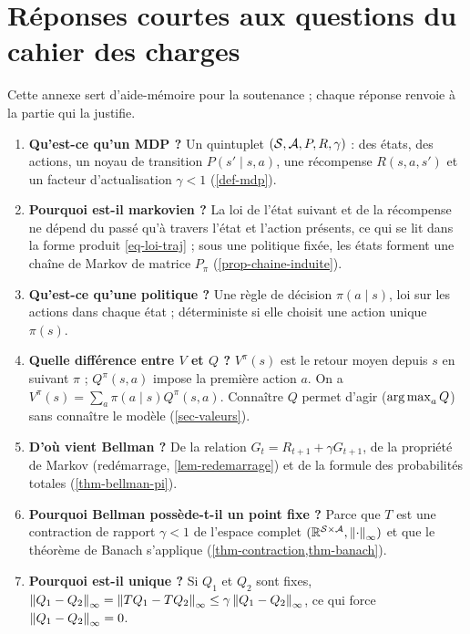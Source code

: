 \appendix

\section{Réponses courtes aux questions du cahier des charges}\label{sec-reponses}

Cette annexe sert d'aide-mémoire pour la soutenance ; chaque réponse renvoie à la partie qui la justifie.

\begin{enumerate}[leftmargin=*]
\item \textbf{Qu'est-ce qu'un MDP ?} Un quintuplet $(\mathcal{S},\mathcal{A},P,R,\gamma)$ : des états, des actions, un noyau de transition $P(s'\mid s,a)$, une récompense $R(s,a,s')$ et un facteur d'actualisation $\gamma<1$ (\cref{def-mdp}).
\item \textbf{Pourquoi est-il markovien ?} La loi de l'état suivant et de la récompense ne dépend du passé qu'à travers l'état et l'action présents, ce qui se lit dans la forme produit \eqref{eq-loi-traj} ; sous une politique fixée, les états forment une chaîne de Markov de matrice $P_\pi$ (\cref{prop-chaine-induite}).
\item \textbf{Qu'est-ce qu'une politique ?} Une règle de décision $\pi(a\mid s)$, loi sur les actions dans chaque état ; déterministe si elle choisit une action unique $\pi(s)$.
\item \textbf{Quelle différence entre $V$ et $Q$ ?} $V^\pi(s)$ est le retour moyen depuis $s$ en suivant $\pi$ ; $Q^\pi(s,a)$ impose la première action $a$. On a $V^\pi(s)=\sum_a\pi(a\mid s)Q^\pi(s,a)$. Connaître $Q$ permet d'agir ($\operatorname*{arg\,max}_aQ$) sans connaître le modèle (\cref{sec-valeurs}).
\item \textbf{D'où vient Bellman ?} De la relation $G_t=R_{t+1}+\gamma G_{t+1}$, de la propriété de Markov (redémarrage, \cref{lem-redemarrage}) et de la formule des probabilités totales (\cref{thm-bellman-pi}).
\item \textbf{Pourquoi Bellman possède-t-il un point fixe ?} Parce que $T$ est une contraction de rapport $\gamma<1$ de l'espace complet $(\mathbb{R}^{\mathcal{S}\times\mathcal{A}},\left\lVert \cdot \right\rVert_\infty)$ et que le théorème de Banach s'applique (\cref{thm-contraction,thm-banach}).
\item \textbf{Pourquoi est-il unique ?} Si $Q_1$ et $Q_2$ sont fixes, $\left\lVert Q_1-Q_2 \right\rVert_\infty=\left\lVert TQ_1-TQ_2 \right\rVert_\infty\le\gamma\left\lVert Q_1-Q_2 \right\rVert_\infty$, ce qui force $\left\lVert Q_1-Q_2 \right\rVert_\infty=0$.

\end{enumerate}
